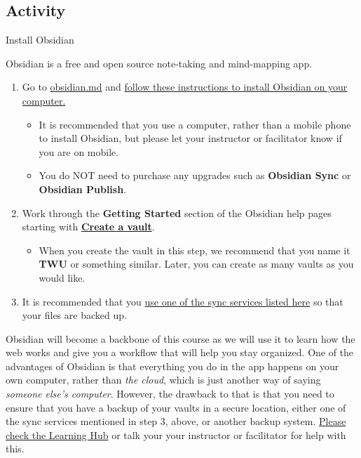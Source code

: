 \documentclass[
]{book}
\providecommand{\tightlist}{%
  \setlength{\itemsep}{0pt}\setlength{\parskip}{0pt}}
\theoremstyle{definition}
\theoremstyle{definition}
\theoremstyle{definition}
\theoremstyle{definition}
\theoremstyle{remark}
\begin{document}
\hypertarget{activity-2}{%
\subsection*{Activity}\label{activity-2}}

\begin{reflect}
{Install Obsidian}

Obsidian is a free and open source note-taking and mind-mapping app.

\begin{enumerate}
\def\labelenumi{\arabic{enumi}.}
\tightlist
\item
  Go to \href{https://obsidian.md/download}{obsidian.md} and \href{https://help.obsidian.md/Getting+started/Download+and+install+Obsidian}{follow these instructions to install Obsidian on your computer.}

  \begin{itemize}
  \tightlist
  \item
    It is recommended that you use a computer, rather than a mobile phone to install Obsidian, but please let your instructor or facilitator know if you are on mobile.
  \item
    You do NOT need to purchase any upgrades such as \textbf{Obsidian Sync} or \textbf{Obsidian Publish}.
  \end{itemize}
\item
  Work through the \textbf{Getting Started} section of the Obsidian help pages starting with \textbf{\href{https://help.obsidian.md/Getting+started/Create+a+vault}{Create a vault}}.

  \begin{itemize}
  \tightlist
  \item
    When you create the vault in this step, we recommend that you name it \textbf{TWU} or something similar. Later, you can create as many vaults as you would like.
  \end{itemize}
\item
  It is recommended that you \href{https://help.obsidian.md/Getting+started/Sync+your+notes+across+devices}{use one of the sync services listed here} so that your files are backed up.
\end{enumerate}
\end{reflect}

Obsidian will become a backbone of this course as we will use it to learn how the web works and give you a workflow that will help you stay organized. One of the advantages of Obsidian is that everything you do in the app happens on your own computer, rather than \emph{the cloud}, which is just another way of saying \emph{someone else's computer}. However, the drawback to that is that you need to ensure that you have a backup of your vaults in a secure location, either one of the sync services mentioned in step 3, above, or another backup system. \href{https://twu.discourse.group/c/ldrs101/10}{Please check the Learning Hub} or talk your your instructor or facilitator for help with this.
\end{document}
